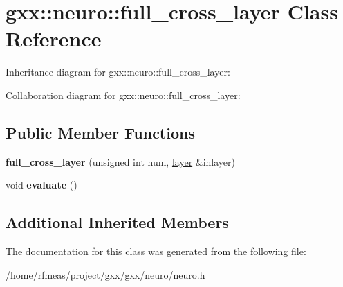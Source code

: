 \hypertarget{classgxx_1_1neuro_1_1full__cross__layer}{}\section{gxx\+:\+:neuro\+:\+:full\+\_\+cross\+\_\+layer Class Reference}
\label{classgxx_1_1neuro_1_1full__cross__layer}


Inheritance diagram for gxx\+:\+:neuro\+:\+:full\+\_\+cross\+\_\+layer\+:


Collaboration diagram for gxx\+:\+:neuro\+:\+:full\+\_\+cross\+\_\+layer\+:
\subsection*{Public Member Functions}
\begin{DoxyCompactItemize}
\item 
{\bfseries full\+\_\+cross\+\_\+layer} (unsigned int num, \hyperlink{classgxx_1_1neuro_1_1layer}{layer} \&inlayer)\hypertarget{classgxx_1_1neuro_1_1full__cross__layer_a6b8484bba92c8149818b409a9d8d7428}{}\label{classgxx_1_1neuro_1_1full__cross__layer_a6b8484bba92c8149818b409a9d8d7428}

\item 
void {\bfseries evaluate} ()\hypertarget{classgxx_1_1neuro_1_1full__cross__layer_a08a27d33cf8a47478c87cec12c25c942}{}\label{classgxx_1_1neuro_1_1full__cross__layer_a08a27d33cf8a47478c87cec12c25c942}

\end{DoxyCompactItemize}
\subsection*{Additional Inherited Members}


The documentation for this class was generated from the following file\+:\begin{DoxyCompactItemize}
\item 
/home/rfmeas/project/gxx/gxx/neuro/neuro.\+h\end{DoxyCompactItemize}
